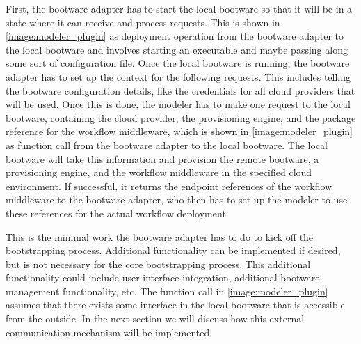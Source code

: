 First, the bootware adapter has to start the local bootware so that it will be in a state where it can receive and process requests.
This is shown in \autoref{image:modeler_plugin} as deployment operation from the bootware adapter to the local bootware and involves starting an executable and maybe passing along some sort of configuration file.
Once the local bootware is running, the bootware adapter has to set up the context for the following requests.
This includes telling the bootware configuration details, like the credentials for all cloud providers that will be used.
Once this is done, the modeler has to make one request to the local bootware, containing the cloud provider, the provisioning engine, and the package reference for the workflow middleware, which is shown in \autoref{image:modeler_plugin} as function call from the bootware adapter to the local bootware.
The local bootware will take this information and provision the remote bootware, a provisioning engine, and the workflow middleware in the specified cloud environment.
If successful, it returns the endpoint references of the workflow middleware to the bootware adapter, who then has to set up the modeler to use these references for the actual workflow deployment.

This is the minimal work the bootware adapter has to do to kick off the bootstrapping process.
Additional functionality can be implemented if desired, but is not necessary for the core bootstrapping process.
This additional functionality could include user interface integration, additional bootware management functionality, etc.
The function call in \autoref{image:modeler_plugin} assumes that there exists some interface in the local bootware that is accessible from the outside.
In the next section we will discuss how this external communication mechanism will be implemented.
